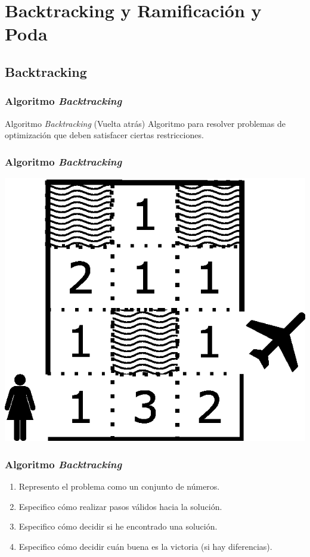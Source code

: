 \documentclass[a4paper,t,xcolor=pst,dvips,colortheme]{beamer}
\begin{document}
\section{Backtracking y Ramificación y Poda}

\subsection{Backtracking}

\begin{frame}[c]
    \frametitle{Algoritmo \emph{Backtracking}}
    \begin{block}{Algoritmo \emph{Backtracking} (Vuelta atrás)}
        Algoritmo para resolver problemas de optimización que deben satisfacer ciertas restricciones.
    \end{block}
\end{frame}

\begin{frame}[c]
    \frametitle{Algoritmo \emph{Backtracking}}
    \begin{center}
        \includegraphics[width=0.5\linewidth]{images/backtracking/laberinto.eps}
    \end{center}
\end{frame}

\begin{frame}[c]
    \frametitle{Algoritmo \emph{Backtracking}}
    \begin{enumerate}[<+->]
        \item Represento el problema como un conjunto de números.
        \item Especifico cómo realizar pasos válidos hacia la solución.
        \item Especifico cómo decidir si he encontrado una solución.
        \item Especifico cómo decidir cuán buena es la victoria (si hay diferencias).
    \end{enumerate}
\end{frame}
\end{document}
